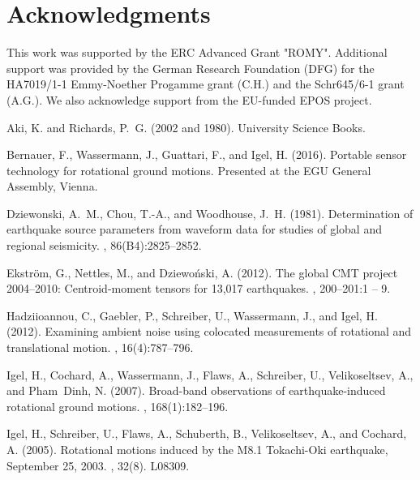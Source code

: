 \documentclass[12pt,reqno,letter]{article}
\begin{document}
\section*{Acknowledgments}
This work was supported by the ERC Advanced Grant "ROMY". Additional support was provided by the German Research Foundation (DFG) for the HA7019/1-1 Emmy-Noether Progamme grant (C.H.) and the Schr645/6-1 grant (A.G.). We also acknowledge support from the EU-funded EPOS project. 


\label{Bibliography}
\begin{thebibliography}{}

{Aki}, K. and {Richards}, P.~G. (2002 and 1980).
\newblock University Science Books.

Bernauer, F., Wassermann, J., Guattari, F., and Igel, H. (2016).
\newblock Portable sensor technology for rotational ground motions.
\newblock Presented at the EGU General Assembly, Vienna.

Dziewonski, A.~M., Chou, T.-A., and Woodhouse, J.~H. (1981).
\newblock Determination of earthquake source parameters from waveform data for
  studies of global and regional seismicity.
,
  86(B4):2825--2852.

Ekstr{\"o}m, G., Nettles, M., and Dziewo\'{n}ski, A. (2012).
\newblock The global {CMT} project 2004–2010: Centroid-moment tensors for
  13,017 earthquakes.
, 200–201:1 -- 9.

Hadziioannou, C., Gaebler, P., Schreiber, U., Wassermann, J., and Igel, H.
  (2012).
\newblock Examining ambient noise using colocated measurements of rotational
  and translational motion.
, 16(4):787--796.

Igel, H., Cochard, A., Wassermann, J., Flaws, A., Schreiber, U., Velikoseltsev,
  A., and Pham~Dinh, N. (2007).
\newblock Broad-band observations of earthquake-induced rotational ground
  motions.
, 168(1):182--196.

Igel, H., Schreiber, U., Flaws, A., Schuberth, B., Velikoseltsev, A., and
  Cochard, A. (2005).
\newblock Rotational motions induced by the {M}8.1 Tokachi-{O}ki earthquake,
  {S}eptember 25, 2003.
, 32(8).
\newblock L08309.


\end{thebibliography}
\end{document}
